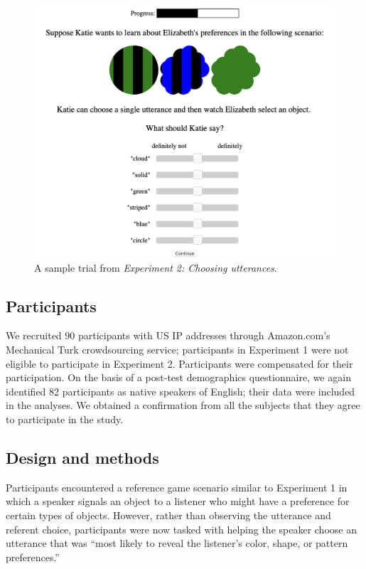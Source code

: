 \documentclass[11pt,a4paper]{article}
\begin{document}
\begin{figure}[ht]
	\centering
	\includegraphics[width=4.5in]{images/utterance-choice-trial.png}
	\caption{A sample trial from \emph{Experiment 2: Choosing utterances}. }\label{exp2-trial}
\end{figure} 

\subsection{Participants}

We recruited $90$ participants with US IP addresses through Amazon.com's Mechanical Turk crowdsourcing service; participants in Experiment 1 were not eligible to participate in Experiment 2. Participants were compensated for their participation. On the basis of a post-test demographics questionnaire, we again identified 82 participants as native speakers of English; their data were included in the analyses. We obtained a confirmation from all the subjects that they agree to participate in the study.

\subsection{Design and methods}

Participants encountered a reference game scenario similar to Experiment 1 in which a speaker signals an object to a listener who might have a preference for certain types of objects. However, rather than observing the utterance and referent choice, participants were now tasked with helping the speaker choose an utterance that was ``most likely to reveal the listener's color, shape, or pattern preferences.''
\end{document}
